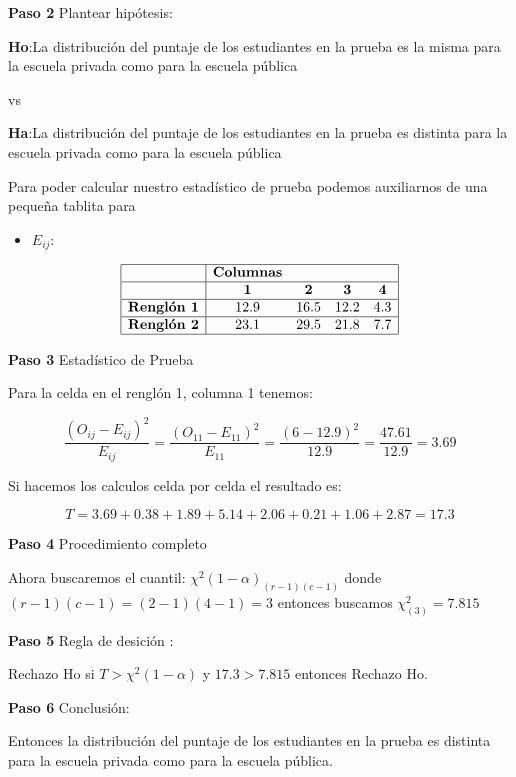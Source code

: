 \documentclass[a4paper,oneside,openany]{book}
\providecommand{\tightlist}{%
  \setlength{\itemsep}{0pt}\setlength{\parskip}{0pt}}
\begin{document}
\textbf{Paso 2} Plantear hipótesis:

\textbf{Ho}:La distribución del puntaje de los estudiantes en la prueba
es la misma para la escuela privada como para la escuela pública

vs

\textbf{Ha}:La distribución del puntaje de los estudiantes en la prueba
es distinta para la escuela privada como para la escuela pública

Para poder calcular nuestro estadístico de prueba podemos auxiliarnos de
una pequeña tablita para

\begin{itemize}
\tightlist
\item
  \(E_{ij}:\)
\end{itemize}

\[
\begin{equation*}
\begin{array}{ |c|cccc|  }
\hline
&\textbf{Columnas} & & &\\
\hline
&\textbf{1} & \textbf{2} & \textbf{3} & \textbf{4} \\
\hline
\textbf{Renglón 1} & 12.9   & 16.5 & 12.2 & 4.3 \\
\hline
\textbf{Renglón 2} & 23.1   & 29.5 & 21.8 & 7.7 \\
\hline
\end{array}
\end{equation*}
\]

\textbf{Paso 3} Estadístico de Prueba

Para la celda en el renglón 1, columna 1 tenemos:

\[\frac{(O_{ij}-E_{ij})^2}{E_{ij}}= \frac{(O_{11}-E_{11})^2}{E_{11}}=\frac{(6-12.9)^2}{12.9}=\frac{47.61}{12.9}=3.69\]

Si hacemos los calculos celda por celda el resultado es:

\[T=3.69+0.38+1.89+5.14+2.06+0.21+1.06+2.87=17.3\]

\textbf{Paso 4} Procedimiento completo

Ahora buscaremos el cuantil: \(\chi^2(1-\alpha)_{(r-1)(c-1)}\) donde
\((r-1)(c-1)=(2-1)(4-1)=3\) entonces buscamos \(\chi^2_{(3)}=7.815\)

\textbf{Paso 5} Regla de desición :

Rechazo Ho si \(T> \chi^2(1-\alpha)\) y \(17.3> 7.815\) entonces Rechazo
Ho.

\textbf{Paso 6} Conclusión:

Entonces la distribución del puntaje de los estudiantes en la prueba es
distinta para la escuela privada como para la escuela pública.
\end{document}
